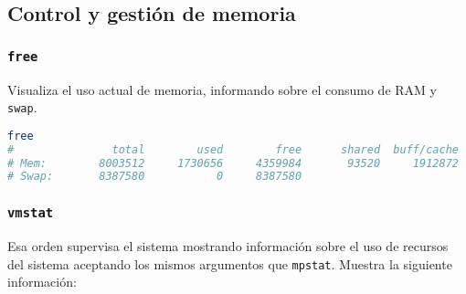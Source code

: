 \subsection{Control y gestión de memoria}

\subsubsection{\texttt{free}}

Visualiza el uso actual de memoria, informando sobre el consumo de RAM y \texttt{swap}.

\begin{lstlisting}[language=Bash]
free
#               total        used        free      shared  buff/cache   available
# Mem:        8003512     1730656     4359984       93520     1912872     5869584
# Swap:       8387580           0     8387580
\end{lstlisting}

\subsubsection{\texttt{vmstat}}

Esa orden supervisa el sistema mostrando información sobre el uso de recursos del sistema aceptando los mismos argumentos que \texttt{mpstat}.
Muestra la siguiente información:

